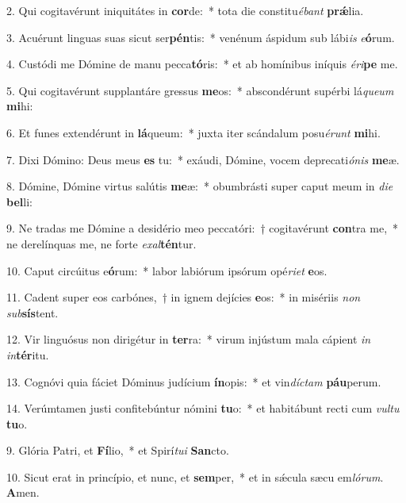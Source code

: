 \item 2. Qui cogitavérunt iniquitátes in \textbf{cor}de:~* tota die constitu\textit{ébant} \textbf{prǽ}lia.
\item 3. Acuérunt linguas suas sicut ser\textbf{pén}tis:~* venénum áspidum sub lábi\textit{is} \textit{e}\textbf{ó}rum.
\item 4. Custódi me Dómine de manu pecca\textbf{tó}ris:~* et ab homínibus iníquis \textit{éri}\textbf{pe} me.
\item 5. Qui cogitavérunt supplantáre gressus \textbf{me}os:~* abscondérunt supérbi lá\textit{queum} \textbf{mi}hi:
\item 6. Et funes extendérunt in \textbf{lá}queum:~* juxta iter scándalum posu\textit{érunt} \textbf{mi}hi.
\item 7. Dixi Dómino: Deus meus \textbf{es} tu:~* exáudi, Dómine, vocem deprecati\textit{ónis} \textbf{me}æ.
\item 8. Dómine, Dómine virtus salútis \textbf{me}æ:~* obumbrásti super caput meum in \textit{die} \textbf{bel}li:
\item 9. Ne tradas me Dómine a desidério meo peccatóri:~† cogitavérunt \textbf{con}tra me,~* ne derelínquas me, ne forte \textit{exal}\textbf{tén}tur.
\item 10. Caput circúitus e\textbf{ó}rum:~* labor labiórum ipsórum opé\textit{riet} \textbf{e}os.
\item 11. Cadent super eos carbónes,~† in ignem dejícies \textbf{e}os:~* in misériis \textit{non} \textit{sub}\textbf{sís}tent.
\item 12. Vir linguósus non dirigétur in \textbf{ter}ra:~* virum injústum mala cápient \textit{in} \textit{in}\textbf{tér}itu.
\item 13. Cognóvi quia fáciet Dóminus judícium \textbf{ín}opis:~* et vin\textit{díctam} \textbf{páu}perum.
\item 14. Verúmtamen justi confitebúntur nómini \textbf{tu}o:~* et habitábunt recti cum \textit{vultu} \textbf{tu}o.
\item 9. Glória Patri, et \textbf{Fí}lio,~* et Spirí\hspace{0.03em}\textit{tui} \textbf{San}cto.
\item 10. Sicut erat in princípio, et nunc, et \textbf{sem}per,~* et in sǽcula sæcu em\textit{lórum}. \textbf{A}men.